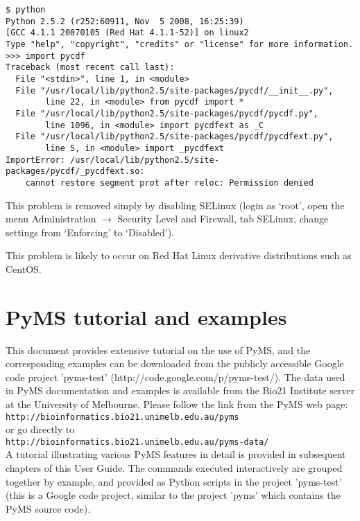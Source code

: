 \begin{verbatim}
$ python
Python 2.5.2 (r252:60911, Nov  5 2008, 16:25:39)
[GCC 4.1.1 20070105 (Red Hat 4.1.1-52)] on linux2
Type "help", "copyright", "credits" or "license" for more information.
>>> import pycdf
Traceback (most recent call last):
  File "<stdin>", line 1, in <module>
  File "/usr/local/lib/python2.5/site-packages/pycdf/__init__.py",
        line 22, in <module> from pycdf import *
  File "/usr/local/lib/python2.5/site-packages/pycdf/pycdf.py",
        line 1096, in <module> import pycdfext as _C
  File "/usr/local/lib/python2.5/site-packages/pycdf/pycdfext.py",
        line 5, in <module> import _pycdfext
ImportError: /usr/local/lib/python2.5/site-packages/pycdf/_pycdfext.so:
    cannot restore segment prot after reloc: Permission denied
\end{verbatim}

This problem is removed simply by disabling SELinux (login as `root',
open the menu Administration $\rightarrow$ Security Level and Firewall,
tab SELinux, change settings from `Enforcing' to `Disabled').

This problem is likely to occur on Red Hat Linux derivative distributions
such as CentOS.

\section{PyMS tutorial and examples}

This document provides extensive tutorial on the use of PyMS, and the
corresponding examples can be downloaded from the publicly accessible
Google code project 'pyms-test' (http://code.google.com/p/pyms-test/). 
The data used in PyMS documentation and examples is available from the
Bio21 Institute server at the University of Melbourne. Please follow
the link from the PyMS web page:\\
{\tt http://bioinformatics.bio21.unimelb.edu.au/pyms}\\
or go directly to\\
{\tt http://bioinformatics.bio21.unimelb.edu.au/pyms-data/}\\

A tutorial illustrating various PyMS features in detail is provided
in subsequent chapters of this User Guide. The commands executed
interactively are grouped together by example, and provided as
Python scripts in the project 'pyms-test' (this is a Google code
project, similar to the project 'pyms' which contains the PyMS
source code).

